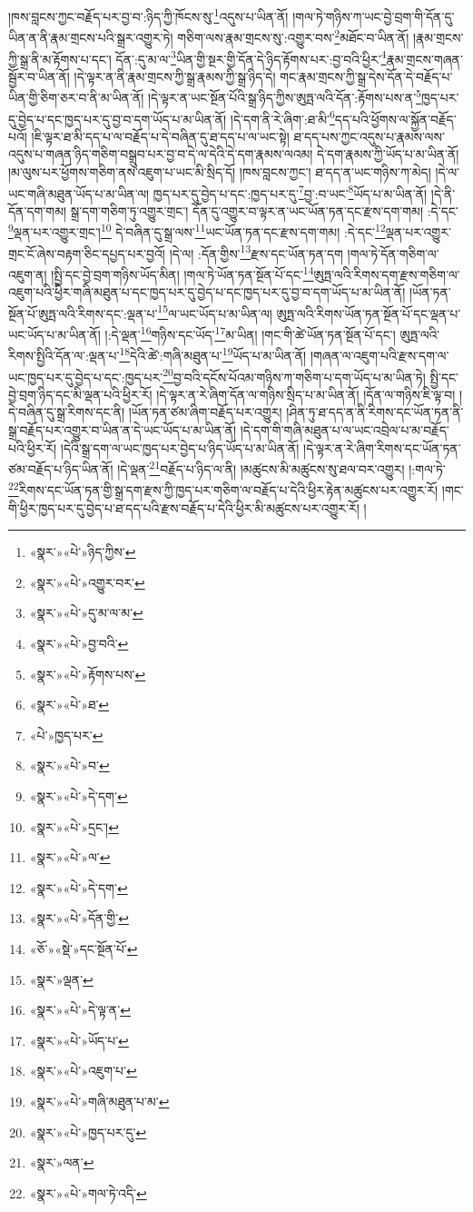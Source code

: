 །ཁས་བླངས་ཀྱང་བརྗོད་པར་བྱ་བ་:ཉིད་ཀྱི་ཁོངས་སུ་\footnote{«སྣར་»«པེ་»ཉིད་ཀྱིས་}འདུས་པ་ཡིན་ནོ། །གལ་ཏེ་གཉིས་ཀ་ཡང་བྱེ་བྲག་གི་དོན་དུ་ཡིན་ན་ནི་རྣམ་གྲངས་པའི་སྒྲར་འགྱུར་ཏེ། གཅིག་ལས་རྣམ་གྲངས་སུ་:འགྱུར་བས་\footnote{«སྣར་»«པེ་»འགྱུར་བར་}མཐོང་བ་ཡིན་ནོ། །རྣམ་གྲངས་ཀྱི་སྒྲ་ནི་མ་རྟོགས་པ་དང་། དོན་:དུ་མ་ལ་\footnote{«སྣར་»«པེ་»དུ་མ་ལ་མ་}ཡིན་གྱི་སྔར་གྱི་དོན་དེ་ཉིད་རྟོགས་པར་:བྱ་བའི་ཕྱིར་\footnote{«སྣར་»«པེ་»བྱ་བའི་}རྣམ་གྲངས་གཞན་སྦྱོར་བ་ཡིན་ནོ། །དེ་ལྟར་ན་ནི་རྣམ་གྲངས་ཀྱི་སྒྲ་རྣམས་ཀྱི་སྒྲ་ཉིད་དེ། གང་རྣམ་གྲངས་ཀྱི་སྒྲ་དེས་དོན་དེ་བརྗོད་པ་ཡིན་གྱི་ཅིག་ཅར་བ་ནི་མ་ཡིན་ནོ། །དེ་ལྟར་ན་ཡང་སྔོན་པོའི་སྒྲ་ཉིད་ཀྱིས་ཨུཏྤ་ལའི་དོན་:རྟོགས་པས་ན་\footnote{«སྣར་»«པེ་»རྟོགས་པས་}ཁྱད་པར་དུ་བྱེད་པ་དང་ཁྱད་པར་དུ་བྱ་བ་དག་ཡོད་པ་མ་ཡིན་ནོ། །དེ་དག་ནི་རེ་ཞིག་:ཐ་མི་\footnote{«སྣར་»«པེ་»ཐ་}དད་པའི་ཕྱོགས་ལ་སྐྱོན་བརྗོད་པའོ། །ཇི་ལྟར་ཐ་མི་དད་པ་ལ་བརྗོད་པ་དེ་བཞིན་དུ་ཐ་དད་པ་ལ་ཡང་སྟེ། ཐ་དད་པས་ཀྱང་འདུས་པ་རྣམས་ལས་འདུས་པ་གཞན་ཉིད་གཅིག་བསྒྲུབ་པར་བྱ་བ་དེ་ལ་དེའི་དེ་དག་རྣམས་ལའམ། དེ་དག་རྣམས་ཀྱི་ཡོད་པ་མ་ཡིན་ནོ། །མ་ལུས་པར་ཕྱོགས་གཅིག་ནས་འཇུག་པ་ཡང་མི་སྲིད་དོ། །ཁས་བླངས་ཀྱང་། ཐ་དད་ན་ཡང་གཉིས་ཀ་མེད། །དེ་ལ་ཡང་གཞི་མཐུན་ཡོད་པ་མ་ཡིན་ལ། ཁྱད་པར་དུ་བྱེད་པ་དང་:ཁྱད་པར་དུ་\footnote{«པེ་»ཁྱད་པར་}བྱ་:བ་ཡང་\footnote{«སྣར་»«པེ་»བ་}ཡོད་པ་མ་ཡིན་ནོ། །དེ་ནི་དོན་དག་གམ། སྒྲ་དག་གཅིག་ཏུ་འགྱུར་གྲང་། དོན་དུ་འགྱུར་བ་ལྟར་ན་ཡང་ཡོན་ཏན་དང་རྫས་དག་གམ། :དེ་དང་\footnote{«སྣར་»«པེ་»དེ་དག་}ལྡན་པར་འགྱུར་གྲང་།\footnote{«སྣར་»«པེ་»དྲང་།} དེ་བཞིན་དུ་སྒྲ་ལས་\footnote{«སྣར་»«པེ་»ལ་}ཡང་ཡོན་ཏན་དང་རྫས་དག་གམ། :དེ་དང་\footnote{«སྣར་»«པེ་»དེ་དག་}ལྡན་པར་འགྱུར་གྲང་ངོ་ཞེས་བརྟག་ཅིང་དཔྱད་པར་བྱའོ། །དེ་ལ། :དོན་གྱིས་\footnote{«སྣར་»«པེ་»དོན་གྱི་}རྫས་དང་ཡོན་ཏན་དག །གལ་ཏེ་དོན་གཅིག་ལ་འཇུག་ན། །སྤྱི་དང་བྱེ་བྲག་གཉིས་ཡོད་མིན། །གལ་ཏེ་ཡོན་ཏན་སྔོན་པོ་དང་\footnote{«ཅོ་»«སྡེ་»དང་སྔོན་པོ་}ཨུཏྤ་ལའི་རིགས་དག་རྫས་གཅིག་ལ་འཇུག་པའི་ཕྱིར་གཞི་མཐུན་པ་དང་ཁྱད་པར་དུ་བྱེད་པ་དང་ཁྱད་པར་དུ་བྱ་བ་དག་ཡོད་པ་མ་ཡིན་ནོ། །ཡོན་ཏན་སྔོན་པོ་ཨུཏྤ་ལའི་རིགས་དང་:ལྡན་པ་\footnote{«སྣར་»ལྡན་}ལ་ཡང་ཡོད་པ་མ་ཡིན་ལ། ཨུཏྤ་ལའི་རིགས་ཡོན་ཏན་སྔོན་པོ་དང་ལྡན་པ་ཡང་ཡོད་པ་མ་ཡིན་ནོ། །:དེ་ལྡན་\footnote{«སྣར་»«པེ་»དེ་ལྟ་ན་}གཉིས་དང་ཡོད་\footnote{«སྣར་»«པེ་»ཡོད་པ་}མ་ཡིན། །གང་གི་ཚེ་ཡོན་ཏན་སྔོན་པོ་དང་། ཨུཏྤ་ལའི་རིགས་སྤྱིའི་དོན་ལ་:ལྡན་པ་\footnote{«སྣར་»«པེ་»འཇུག་པ་}དེའི་ཚེ་:གཞི་མཐུན་པ་\footnote{«སྣར་»«པེ་»གཞི་མཐུན་པ་མ་}ཡོད་པ་མ་ཡིན་ནོ། །གཞན་ལ་འཇུག་པའི་རྫས་དག་ལ་ཡང་ཁྱད་པར་དུ་བྱེད་པ་དང་:ཁྱད་པར་\footnote{«སྣར་»«པེ་»ཁྱད་པར་དུ་}བྱ་བའི་དངོས་པོའམ་གཉིས་ཀ་གཅིག་པ་དག་ཡོད་པ་མ་ཡིན་ཏེ། སྤྱི་དང་བྱེ་བྲག་ཉིད་དང་མི་ལྡན་པའི་ཕྱིར་རོ། །དེ་ལྟར་ན་རེ་ཞིག་དོན་ལ་གཉིས་སྲིད་པ་མ་ཡིན་ནོ། །དོན་ལ་གཉིས་ཇི་ལྟ་བ། །དེ་བཞིན་དུ་སྒྲ་རིགས་དང་ནི། །ཡོན་ཏན་ཙམ་ཞིག་བརྗོད་པར་འགྱུར། །ཤིན་ཏུ་ཐ་དད་ན་ནི་རིགས་དང་ཡོན་ཏན་ནི་སྒྲ་བརྗོད་པར་འགྱུར་བ་ཡིན་ན་དེ་ཡང་ཡོད་པ་མ་ཡིན་ནོ། །དེ་དག་གི་གཞི་མཐུན་པ་ལ་ཡང་འབྲེལ་པ་མ་བརྗོད་པའི་ཕྱིར་རོ། །དེའི་སྒྲ་དག་ལ་ཡང་ཁྱད་པར་བྱེད་པ་ཉིད་ཡོད་པ་མ་ཡིན་ནོ། །དེ་ལྟར་ན་རེ་ཞིག་རིགས་དང་ཡོན་ཏན་ཙམ་བརྗོད་པ་ཉིད་ཡིན་ནོ། །དེ་ལྡན་\footnote{«སྣར་»ལན་}བརྗོད་པ་ཉིད་ལ་ནི། །མཚུངས་མི་མཚུངས་སུ་ཐལ་བར་འགྱུར། །:གལ་ཏེ་\footnote{«སྣར་»«པེ་»གལ་ཏེ་འདི་}རིགས་དང་ཡོན་ཏན་གྱི་སྒྲ་དག་རྫས་ཀྱི་ཁྱད་པར་གཅིག་ལ་བརྗོད་པ་དེའི་ཕྱིར་རྟེན་མཚུངས་པར་འགྱུར་རོ། །གང་གི་ཕྱིར་ཁྱད་པར་དུ་བྱེད་པ་ཐ་དད་པའི་རྫས་བརྗོད་པ་དེའི་ཕྱིར་མི་མཚུངས་པར་འགྱུར་རོ། །
